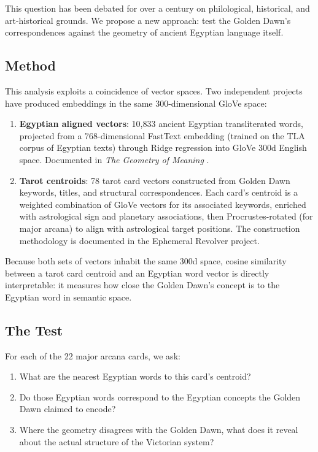 \documentclass[11pt, a4paper]{article}
\begin{document}
This question has been debated for over a century on philological, historical, and art-historical grounds. We propose a new approach: test the Golden Dawn's correspondences against the geometry of ancient Egyptian language itself.

\subsection{Method}

This analysis exploits a coincidence of vector spaces. Two independent projects have produced embeddings in the same 300-dimensional GloVe space:

\begin{enumerate}[nosep]
    \item \textbf{Egyptian aligned vectors}: 10,833 ancient Egyptian transliterated words, projected from a 768-dimensional FastText embedding (trained on the TLA corpus of Egyptian texts) through Ridge regression into GloVe 300d English space. Documented in \textit{The Geometry of Meaning} \citep{brinsmead2026geometry}.

    \item \textbf{Tarot centroids}: 78 tarot card vectors constructed from Golden Dawn keywords, titles, and structural correspondences. Each card's centroid is a weighted combination of GloVe vectors for its associated keywords, enriched with astrological sign and planetary associations, then Procrustes-rotated (for major arcana) to align with astrological target positions. The construction methodology is documented in the Ephemeral Revolver project.
\end{enumerate}

Because both sets of vectors inhabit the same 300d space, cosine similarity between a tarot card centroid and an Egyptian word vector is directly interpretable: it measures how close the Golden Dawn's concept is to the Egyptian word in semantic space.

\subsection{The Test}

For each of the 22 major arcana cards, we ask:

\begin{enumerate}[nosep]
    \item What are the nearest Egyptian words to this card's centroid?
    \item Do those Egyptian words correspond to the Egyptian concepts the Golden Dawn claimed to encode?
    \item Where the geometry disagrees with the Golden Dawn, what does it reveal about the actual structure of the Victorian system?
\end{enumerate}
\end{document}

